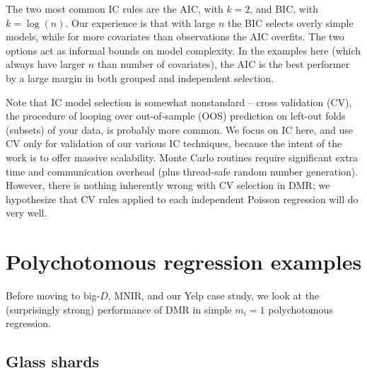\documentclass[12pt]{article}
\begin{document}
The two most common IC rules are the AIC, with $k=2$, and BIC, with
$k=\log(n)$. Our experience is that with large $n$ the BIC selects overly
simple models, while for more covariates than observations the AIC overfits.
The two options act as informal bounds on model complexity.
In the examples here (which always have larger $n$ than number of
covariates), the AIC is the best performer by a large margin in both grouped and independent selection.  

Note that IC model selection is somewhat nonstandard  -- cross validation
(CV), the procedure of looping over out-of-sample (OOS) prediction on 
left-out folds (subsets) of your data, is probably more common.  We focus on IC here, and use CV only for validation of our various IC techniques, because the intent of the work is to offer massive scalability. Monte Carlo routines require significant extra time and communication overhead (plus thread-safe random number generation).  However, there is  nothing inherently wrong with CV selection in DMR; we hypothesize that CV rules applied to each independent Poisson regression will do very well.

\section{Polychotomous regression examples}
\label{M1}

Before moving to big-$D$, MNIR, and our Yelp case study, we look at the
(surprisingly strong) performance of DMR in simple $m_i=1$ polychotomous
regression.

\subsection{Glass shards}
\label{FGL}
\end{document}
